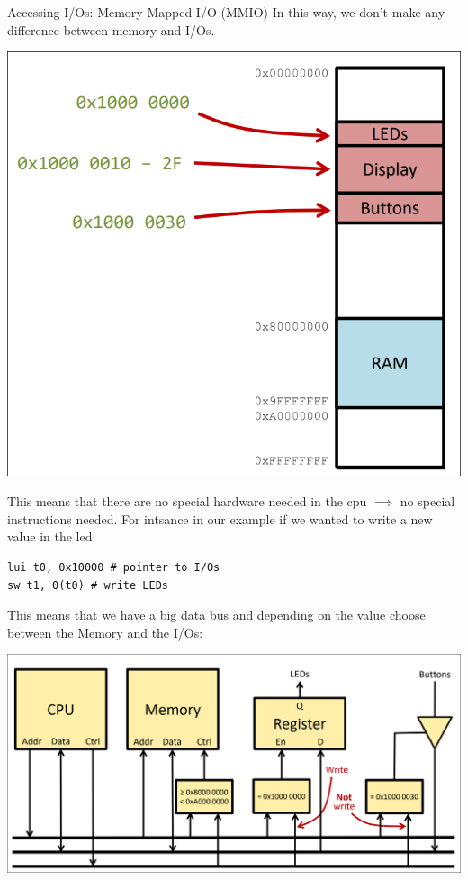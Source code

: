 \begin{parag}{Accessing I/Os: Memory Mapped I/O (MMIO)}
    In this way, we don't make any difference between memory and I/Os.
	\begin{center}
	\includegraphics[scale=0.2]{screenshots/2025-10-22_5.png}
	\end{center}
	This means that there are no special hardware needed in the cpu $\implies$ no special instructions needed. For intsance in our example if we wanted to write a new value in the led:
	\begin{lstlisting}[language={[RISC-V]Assembler}]
lui t0, 0x10000 # pointer to I/Os
sw t1, 0(t0) # write LEDs
	\end{lstlisting}
	This means that we have a big data bus and depending on the value  choose between the Memory and the I/Os:
	\begin{center}
	\includegraphics[scale=0.2]{screenshots/2025-10-22_6.png}
	\end{center}
\end{parag}
